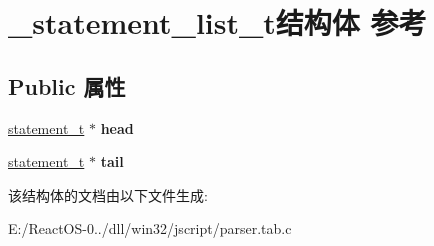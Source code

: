 \hypertarget{struct__statement__list__t}{}\section{\+\_\+statement\+\_\+list\+\_\+t结构体 参考}
\label{struct__statement__list__t}
\subsection*{Public 属性}
\begin{DoxyCompactItemize}
\item 
\mbox{\label{struct__statement__list__t_aa74bda9ea646516f30b9d3ce049d3bff}} 
\hyperlink{struct__statement__t}{statement\+\_\+t} $\ast$ {\bfseries head}
\item 
\mbox{\label{struct__statement__list__t_a6ddcbc8c1cd7f91868f74da078e25429}} 
\hyperlink{struct__statement__t}{statement\+\_\+t} $\ast$ {\bfseries tail}
\end{DoxyCompactItemize}


该结构体的文档由以下文件生成\+:\begin{DoxyCompactItemize}
\item 
E\+:/\+React\+O\+S-\/0../dll/win32/jscript/parser.\+tab.\+c\end{DoxyCompactItemize}
